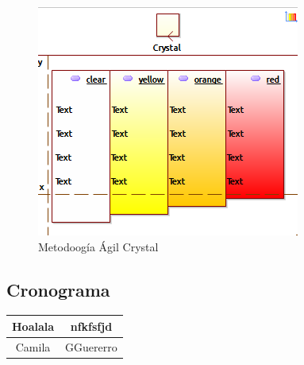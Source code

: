 \begin{figure}[h!]
	\centering
	\includegraphics[width=0.7\linewidth]{proyecto/imgs/metCrystal}
	\caption{Metodoogía Ágil Crystal}
	\label{fig:metcrystal}
\end{figure}

\newpage
\subsection{Cronograma}



\begin{tabular}{|c|c|}
	\hline 
	\rule[-1ex]{0pt}{2.5ex} Hoalala & nfkfsfjd \\ 
	\hline 
	\rule[-1ex]{0pt}{2.5ex} Camila & GGuererro \\ 
	\hline 
\end{tabular} 